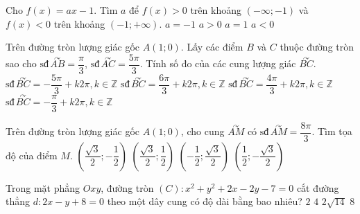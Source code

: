 \begin{ex}%
Cho $f(x)=ax-1$. Tìm $a$ để $f(x)>0$ trên khoảng $(-\infty;-1)$ và $f(x)<0$ trên khoảng $(-1;+\infty)$.
\choice
{\True $a=-1$}
{$a>0$}
{$a=1$}
{$a<0$}
\end{ex}

\begin{ex}%
Trên đường tròn lượng giác gốc $A(1;0)$. Lấy các điểm $B$ và $C$ thuộc đường tròn sao cho $\text{sđ}\,\overset{\curvearrowright}{AB}=\dfrac{\pi}{3}$,  $\text{sđ}\,\overset{\curvearrowright}{AC}=\dfrac{5\pi}{3}$. Tính số đo của các cung lượng giác $\overset{\curvearrowright}{BC}$.
\choice
{$\text{sđ}\,\overset{\curvearrowright}{BC}=-\dfrac{5\pi}{3}+ k2\pi, k\in\mathbb{Z}$}
{$\text{sđ}\,\overset{\curvearrowright}{BC}=\dfrac{6\pi}{3}+ k2\pi, k\in\mathbb{Z}$}
{\True $\text{sđ}\,\overset{\curvearrowright}{BC}=\dfrac{4\pi}{3}+ k2\pi, k\in\mathbb{Z}$}
{$\text{sđ}\,\overset{\curvearrowright}{BC}=-\dfrac{\pi}{3}+ k2\pi, k\in\mathbb{Z}$}
\end{ex}

\begin{ex}%
Trên đường tròn lượng giác gốc $A(1;0)$, cho cung $\overset{\curvearrowright}{AM}$ có $\text{sđ}\,\overset{\curvearrowright}{AM}=\dfrac{8\pi}{3}$. Tìm tọa độ của điểm $M$.
\choice
{$\left( \dfrac{\sqrt{3}}{2}; -\dfrac{1}{2} \right)$}
{$\left( \dfrac{\sqrt{3}}{2}; \dfrac{1}{2} \right)$}
{\True $\left( -\dfrac{1}{2}; \dfrac{\sqrt{3}}{2} \right)$}
{$\left( \dfrac{1}{2}; -\dfrac{\sqrt{3}}{2} \right)$}
\end{ex}

\begin{ex}%
Trong mặt phẳng $Oxy$, đường tròn $(C): x^2+y^2+2x-2y-7=0$ cắt đường thẳng $d: 2x-y+8=0$ theo một dây cung có độ dài bằng bao nhiêu?
\choice
{$2$}
{\True $4$}
{$2\sqrt{14}$}
{$8$}
\end{ex}

